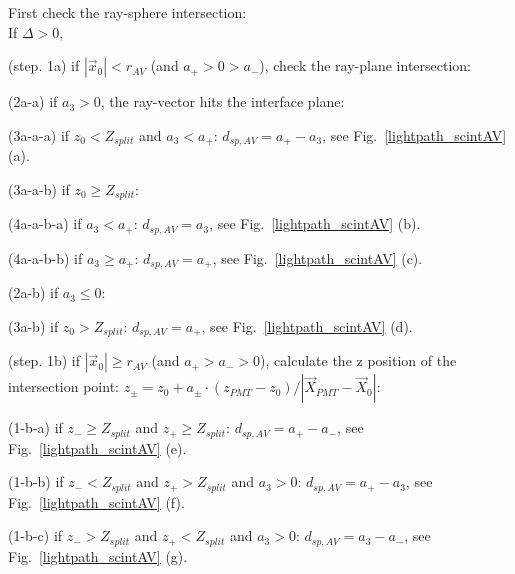 \begin{algorithm}
	First check the ray-sphere intersection:\\
	If {$\Delta>0$}, 
	
	\hspace{2mm}(step. 1a) if $|\vec{x}_0|<r_{AV}$ (and $a_+>0>a_-$), check the ray-plane intersection:
	
	\hspace{4mm}(2a-a) if $a_3>0$, the ray-vector hits the interface plane: 
	
	\hspace{6mm}(3a-a-a) if $z_0<Z_{split}$ and $a_3<a_+$: $d_{sp,AV}=a_+-a_3$, see Fig.~\ref{lightpath_scintAV} (a).
	
	\hspace{6mm}(3a-a-b) if $z_0\geq Z_{split}$:
	
	\hspace{8mm}(4a-a-b-a) if $a_3<a_+$:  $d_{sp,AV}=a_3$, see Fig.~\ref{lightpath_scintAV} (b). 
	
	\hspace{8mm}(4a-a-b-b) if $a_3\geq a_+$:  $d_{sp,AV}=a_+$, see Fig.~\ref{lightpath_scintAV} (c).
	
	\hspace{4mm}(2a-b) if $a_3\leq0$:
	
	\hspace{6mm}(3a-b) if $z_0>Z_{split}$: $d_{sp,AV}=a_+$, see Fig.~\ref{lightpath_scintAV} (d).
	
	\hspace{2mm}(step. 1b) if $|\vec{x}_0|\geq r_{AV}$ (and $a_+>a_->0$), calculate the z position of the intersection point: $z_{\pm}=z_0+a_\pm\cdot(z_{PMT}-z_0)/|\vec{X}_{PMT}-\vec{X}_0|$:
	
	\hspace{4mm}(1-b-a) if $z_- \geq Z_{split}$ and $z_+\geq Z_{split}$: $d_{sp,AV} = a_+ - a_-$, see Fig.~\ref{lightpath_scintAV} (e).
	
	\hspace{4mm}(1-b-b) if $z_-< Z_{split}$ and $z_+> Z_{split}$ and $a_3>0$: $d_{sp,AV} = a_+ - a_3$, see Fig.~\ref{lightpath_scintAV} (f).
	
	\hspace{4mm}(1-b-c) if $z_->Z_{split}$ and $z_+<Z_{split}$ and $a_3>0$: $d_{sp,AV}= a_3 - a_-$, see Fig.~\ref{lightpath_scintAV} (g).
\end{algorithm}

